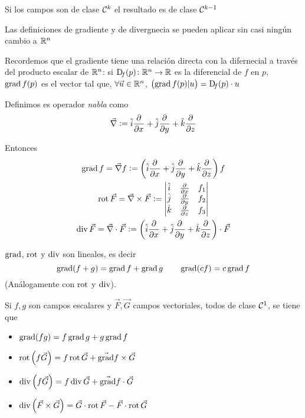 \begin{obs*}
    Si los campos son de clase $\mathcal{C}^k$ el resultado es de clase $\mathcal{C}^{k-1}$
\end{obs*}

\begin{obs*}
    Las definiciones de gradiente y de divergnecia se pueden aplicar sin casi ningún cambio a $\mathbb{R}^n$
\end{obs*}

\begin{obs}
    Recordemos que el gradiente tiene una relación directa con la difernecial a trav\'es del producto escalar
    de $\mathbb{R}^n$: si $\Dif_f(p) \colon \real^n \to \real$ es la diferencial de $f$ en $p$, $\operatorname{grad} f(p)$ es el
    vector tal que, $\forall \vec{u} \in \mathbb{R}^n$, $\left( \grad f(p) \vert u \right) = \Dif_f(p) \cdot u$
\end{obs}

\begin{defi}
    Definimos es operador \emph{nabla} como
    \[
        \vec{\nabla} := \hat{i} \frac{\partial^{} }{\partial x^{}} + \hat{j} \frac{\partial^{} }{\partial y^{}} + \hat{k} \frac{\partial^{} }{\partial z^{}}
    \]

    Entonces
    \begin{gather*}
        \operatorname{grad} f = \vec{\nabla} f := \left( \hat{i} \frac{\partial^{} }{\partial x^{}} + \hat{j} \frac{\partial^{} }{\partial y^{}} + \hat{k} \frac{\partial^{} }{\partial z^{}} \right)f
        \\
        \operatorname{rot} \vec{F} = \vec{\nabla} \times \vec{F} := \begin{vmatrix}
            \hat{i} & \frac{\partial^{} }{\partial x^{}} & f_1 \\
            \hat{j} & \frac{\partial^{} }{\partial y^{}} & f_2 \\
            \hat{k} & \frac{\partial^{} }{\partial z^{}} & f_3
        \end{vmatrix}
        \\
        \operatorname{div} \vec{F} = \vec{\nabla} \cdot \vec{F} := \left( \hat{i} \frac{\partial^{} }{\partial x^{}} + \hat{j} \frac{\partial^{} }{\partial y^{}} + \hat{k} \frac{\partial^{} }{\partial z^{}} \right) \cdot \vec{F}
    \end{gather*}
\end{defi}

\begin{prop}
    $\operatorname{grad}$, $\operatorname{rot}$ y $\operatorname{div}$ son lineales, es decir
    \[
        \operatorname{grad}(f+g) = \operatorname{grad} f + \operatorname{grad} g
        \qquad
        \operatorname{grad}(cf) = c\operatorname{grad} f
    \]
    (Análogamente con $\operatorname{rot}$ y $\operatorname{div}$).
\end{prop}

\begin{prop}
    Si $f,g$ son campos escalares y $\vec{F},\vec{G}$ campos vectoriales, todos de clase $\mathcal{C}^1$, se tiene que
    \begin{itemize}
        \item $\operatorname{grad}(fg) = f \operatorname{grad} g + g \operatorname{grad} f$
        \item $\operatorname{rot} \left( f \vec{G} \right) = f \operatorname{rot} \vec{G} + \vec{\operatorname{grad}} f \times \vec{G}$
        \item $\operatorname{div} \left( f \vec{G} \right) = f \operatorname{div} \vec{G} + \vec{\operatorname{grad}} f \cdot \vec{G}$
        \item $\operatorname{div} \left( \vec{F} \times \vec{G} \right) = \vec{G} \cdot \operatorname{rot} \vec{F} - \vec{F}
            \cdot \operatorname{rot} \vec{G}$
    \end{itemize}
\end{prop}

